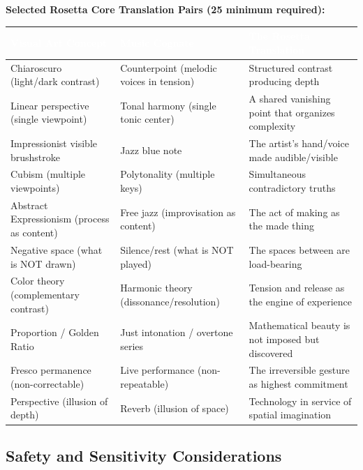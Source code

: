 \documentclass[11pt,letterpaper]{article}
\newcommand{\tableheader}[1]{\textbf{\sffamily\textcolor{white}{#1}}}
\begin{document}
\textbf{Selected Rosetta Core Translation Pairs (25 minimum required):}

\begin{tabularx}{\textwidth}{L{5cm}L{5cm}X}
\toprule
{}
\tableheader{Visual Art Concept} & \tableheader{Music Cognate} & \tableheader{The Rosetta Translation} \\
\midrule
Chiaroscuro (light/dark contrast) & Counterpoint (melodic voices in tension) & Structured contrast producing depth \\
Linear perspective (single viewpoint) & Tonal harmony (single tonic center) & A shared vanishing point that organizes complexity \\
Impressionist visible brushstroke & Jazz blue note & The artist's hand/voice made audible/visible \\
Cubism (multiple viewpoints) & Polytonality (multiple keys) & Simultaneous contradictory truths \\
Abstract Expressionism (process as content) & Free jazz (improvisation as content) & The act of making as the made thing \\
Negative space (what is NOT drawn) & Silence/rest (what is NOT played) & The spaces between are load-bearing \\
Color theory (complementary contrast) & Harmonic theory (dissonance/resolution) & Tension and release as the engine of experience \\
Proportion / Golden Ratio & Just intonation / overtone series & Mathematical beauty is not imposed but discovered \\
Fresco permanence (non-correctable) & Live performance (non-repeatable) & The irreversible gesture as highest commitment \\
Perspective (illusion of depth) & Reverb (illusion of space) & Technology in service of spatial imagination \\
\bottomrule
\end{tabularx}

\subsection{Safety and Sensitivity Considerations}
\end{document}
